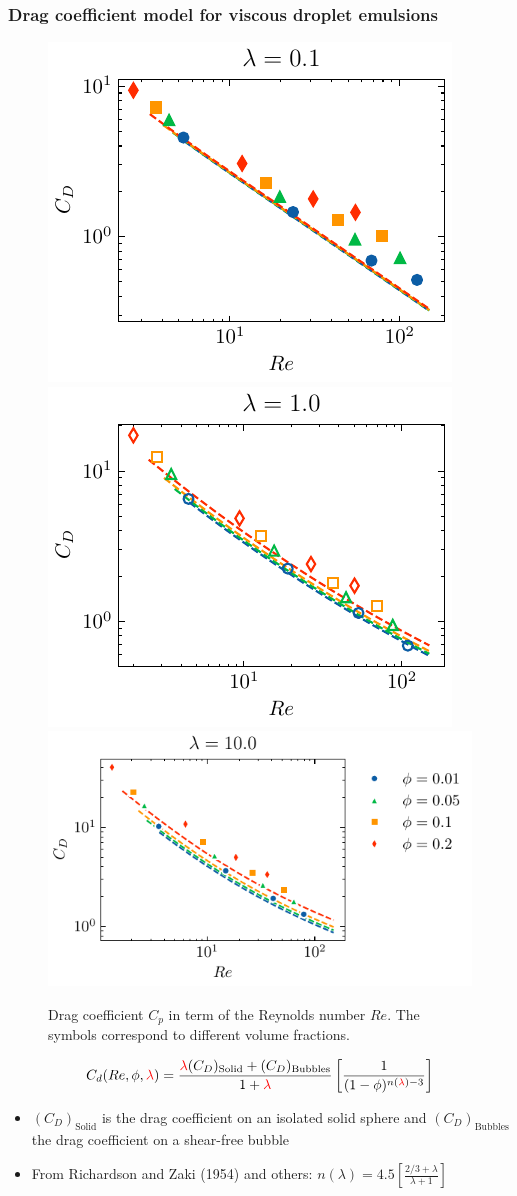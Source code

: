 \documentclass{sintefbeamer}
\begin{document}
\begin{frame}
  \frametitle{Drag coefficient model for viscous droplet emulsions}
  \begin{figure}[h!]
    \centering    
    \includegraphics[height = 0.23\textwidth]{image/HOMOGENEOUS_final/CA/Cp_l_0.pdf}
    \includegraphics[height = 0.23\textwidth]{image/HOMOGENEOUS_final/CA/Cp_l_1.pdf}
    \includegraphics[height = 0.23\textwidth]{image/HOMOGENEOUS_final/CA/Cp_l_10.pdf}
    \caption{
        Drag coefficient $C_p$ in term of the Reynolds number $Re$.  
        The symbols correspond to different volume fractions. 
    }
    \label{fig:Cp}
\end{figure}
\begin{equation*}
  C_d(Re,\phi,\textcolor{red}{\lambda})
  = \frac{  \textcolor{red}{\lambda}   (C_D)_\text{Solid}+ (C_D)_\text{Bubbles}}
  {1+\textcolor{red}{\lambda}} 
  \left[
    \frac{1}{(1- \phi)^{n(\textcolor{red}{\lambda})-3}}
  \right]
\end{equation*}
\begin{itemize}
  \item $(C_D)_\text{Solid}$ is the drag coefficient on an isolated solid sphere and $(C_D)_\text{Bubbles}$ the drag coefficient on a shear-free bubble
  \item From Richardson and Zaki (1954) and others: $n(\lambda) = 4.5 \left[\frac{2/3 +\lambda }{\lambda +1}\right]$ 
\end{itemize}

\end{frame}
\end{document}
